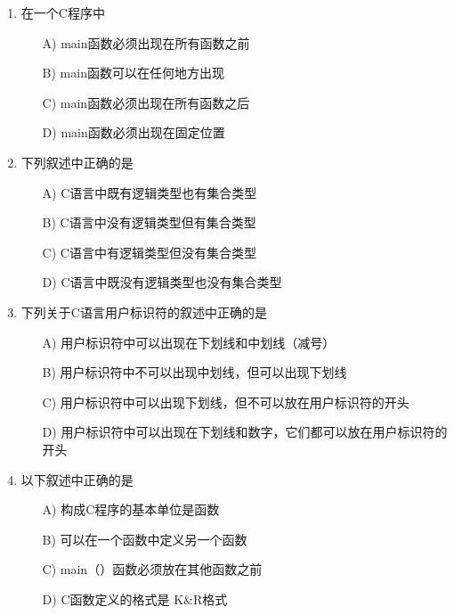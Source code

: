 \documentclass[a4paper,12pt]{article}
\begin{document}
\begin{enumerate}
	\item 在一个C程序中
	      \begin{enumerate}
		      \item[A)] main函数必须出现在所有函数之前
		      \item[B)] main函数可以在任何地方出现
		      \item[C)] main函数必须出现在所有函数之后
		      \item[D)] main函数必须出现在固定位置
	      \end{enumerate}
	      \vspace{0.3cm}

	\item 下列叙述中正确的是
	      \begin{enumerate}
		      \item[A)] C语言中既有逻辑类型也有集合类型
		      \item[B)] C语言中没有逻辑类型但有集合类型
		      \item[C)] C语言中有逻辑类型但没有集合类型
		      \item[D)] C语言中既没有逻辑类型也没有集合类型
	      \end{enumerate}
	      \vspace{0.3cm}

	\item 下列关于C语言用户标识符的叙述中正确的是
	      \begin{enumerate}
		      \item[A)] 用户标识符中可以出现在下划线和中划线（减号）
		      \item[B)] 用户标识符中不可以出现中划线，但可以出现下划线
		      \item[C)] 用户标识符中可以出现下划线，但不可以放在用户标识符的开头
		      \item[D)] 用户标识符中可以出现在下划线和数字，它们都可以放在用户标识符的开头
	      \end{enumerate}
	      \vspace{0.3cm}

	\item 以下叙述中正确的是
	      \begin{enumerate}
		      \item[A)] 构成C程序的基本单位是函数
		      \item[B)] 可以在一个函数中定义另一个函数
		      \item[C)] main（）函数必须放在其他函数之前
		      \item[D)] C函数定义的格式是 K\&R格式
	      \end{enumerate}
	      \vspace{0.3cm}


\end{enumerate}
\end{document}
